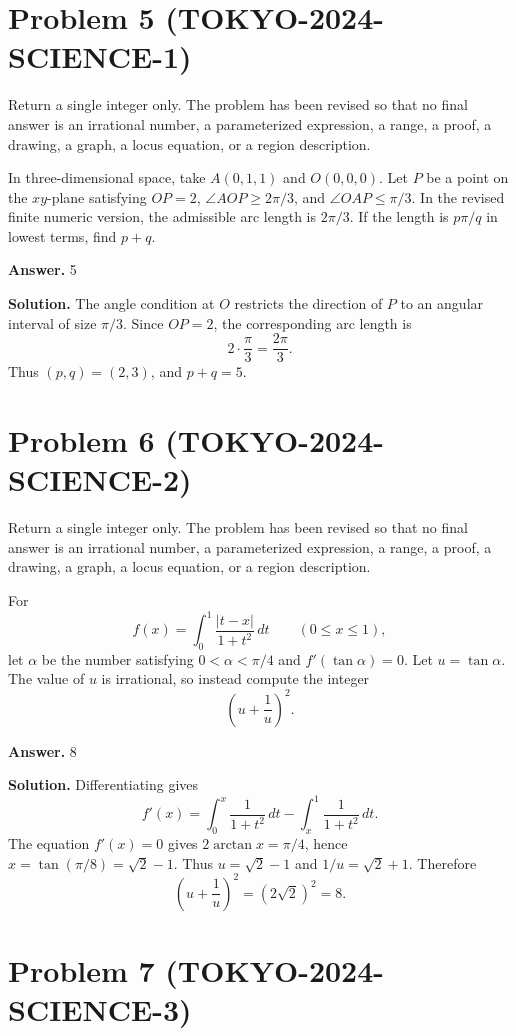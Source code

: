 \documentclass[11pt]{article}
\begin{document}
\section*{Problem 5 (TOKYO-2024-SCIENCE-1)}

Return a single integer only. The problem has been revised so that no final answer is an irrational number, a parameterized expression, a range, a proof, a drawing, a graph, a locus equation, or a region description.

In three-dimensional space, take \(A(0,1,1)\) and \(O(0,0,0)\). Let \(P\) be a
point on the \(xy\)-plane satisfying \(OP=2\),
\(\angle AOP\ge 2\pi/3\), and \(\angle OAP\le \pi/3\). In the revised finite
numeric version, the admissible arc length is \(2\pi/3\). If the length is
\(p\pi/q\) in lowest terms, find \(p+q\).


\textbf{Answer.} 5


\textbf{Solution.}
The angle condition at \(O\) restricts the direction of \(P\) to an angular
interval of size \(\pi/3\). Since \(OP=2\), the corresponding arc length is
\[
2\cdot \frac{\pi}{3}=\frac{2\pi}{3}.
\]
Thus \((p,q)=(2,3)\), and \(p+q=5\).


\section*{Problem 6 (TOKYO-2024-SCIENCE-2)}

Return a single integer only. The problem has been revised so that no final answer is an irrational number, a parameterized expression, a range, a proof, a drawing, a graph, a locus equation, or a region description.

For
\[
f(x)=\int_0^1\frac{|t-x|}{1+t^2}\,dt\qquad(0\le x\le1),
\]
let \(\alpha\) be the number satisfying \(0<\alpha<\pi/4\) and
\(f'(\tan\alpha)=0\). Let \(u=\tan\alpha\). The value of \(u\) is irrational, so
instead compute the integer
\[
\left(u+\frac1u\right)^2.
\]


\textbf{Answer.} 8


\textbf{Solution.}
Differentiating gives
\[
f'(x)=\int_0^x\frac{1}{1+t^2}\,dt-\int_x^1\frac{1}{1+t^2}\,dt.
\]
The equation \(f'(x)=0\) gives \(2\arctan x=\pi/4\), hence
\(x=\tan(\pi/8)=\sqrt2-1\). Thus \(u=\sqrt2-1\) and
\(1/u=\sqrt2+1\). Therefore
\[
\left(u+\frac1u\right)^2=(2\sqrt2)^2=8.
\]


\section*{Problem 7 (TOKYO-2024-SCIENCE-3)}
\end{document}
